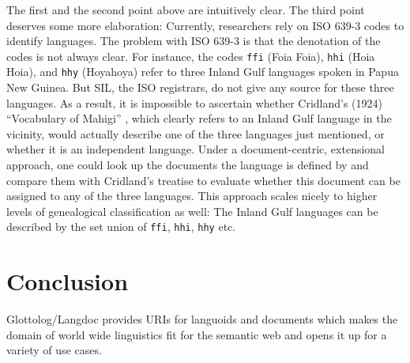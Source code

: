 \documentclass[10pt, a4paper]{article}
\begin{document}
The first and the second point above are intuitively clear. The third point deserves some more elaboration: Currently, researchers rely on ISO 639-3 codes to identify languages.                                                                                                                                                                                                                                                                                                    
The problem with ISO 639-3 is that the denotation of the codes is not always
clear. For instance, the codes \texttt{ffi} (Foia Foia), \texttt{hhi} (Hoia Hoia), and \texttt{hhy} (Hoyahoya)
refer to three Inland Gulf languages spoken in Papua New Guinea. But
SIL, the ISO registrars, do not give any source for these three languages. As a
result, it is impossible to ascertain whether  Cridland's (1924) ``Vocabulary of
Mahigi'' \cite{w:Cridland:Mahigi}, which clearly refers to an Inland Gulf language in the vicinity, would
actually describe one of the three languages just mentioned, or whether it is an
independent language. Under a document-centric, extensional approach, one could look up the documents the language is defined by and compare them with Cridland's treatise to evaluate whether this document can be assigned to any of the three languages.
This approach scales nicely to higher levels of genealogical classification as well: The Inland Gulf languages can be described by the set union of \texttt{ffi}, \texttt{hhi}, \texttt{hhy} etc.

\section{Conclusion}
Glottolog/Langdoc provides URIs for languoids and documents which makes the domain of world wide linguistics fit for the semantic web and opens it up for a variety of use cases.
\end{document}
